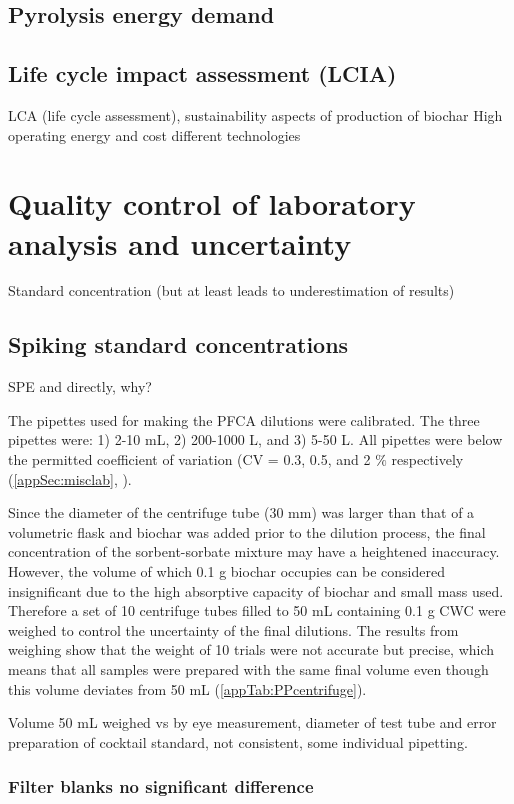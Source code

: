 \subsection{Pyrolysis energy demand}
\subsection{Life cycle impact assessment (LCIA)}
LCA (life cycle assessment), sustainability aspects of production of biochar
High operating energy and cost different technologies \citep{Alhashimi2017}

\section{Quality control of laboratory analysis and uncertainty}
Standard concentration (but at least leads to underestimation of results)
\subsection{Spiking standard concentrations}
SPE and directly, why?

The pipettes used for making the PFCA dilutions were calibrated. The three pipettes were: 1) 2-10 mL, 2) 200-1000 \textmu L, and 3) 5-50 \textmu L. All pipettes were below the permitted coefficient of variation (CV = 0.3, 0.5, and 2 $\%$ respectively (\cref{appSec:misclab}, ).

Since the diameter of the centrifuge tube (30 mm) was larger than that of a volumetric flask and biochar was added prior to the dilution process, the final concentration of the sorbent-sorbate mixture may have a heightened inaccuracy. However, the volume of which 0.1 g biochar occupies can be considered insignificant due to the high absorptive capacity of biochar and small mass used. Therefore a set of 10 centrifuge tubes filled to 50 mL containing 0.1 g CWC were weighed to control the uncertainty of the final dilutions. The results from weighing show that the weight of 10 trials were not accurate but precise, which means that all samples were prepared with the same final volume even though this volume deviates from 50 mL (\cref{appTab:PPcentrifuge}). 

Volume 50 mL weighed vs by eye measurement, diameter of test tube and error
preparation of cocktail standard, not consistent, some individual pipetting. 

\subsubsection{Filter blanks no significant difference}

